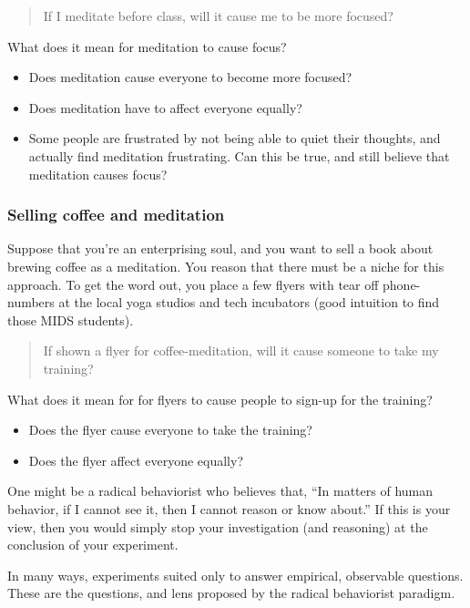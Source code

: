 \documentclass[
]{article}
\providecommand{\tightlist}{%
  \setlength{\itemsep}{0pt}\setlength{\parskip}{0pt}}
\theoremstyle{definition}
\theoremstyle{definition}
\theoremstyle{definition}
\theoremstyle{definition}
\theoremstyle{remark}
\begin{document}
\begin{quote}
If I meditate before class, will it cause me to be more focused?
\end{quote}

What does it mean for meditation to cause focus?

\begin{itemize}
\tightlist
\item
  Does meditation cause everyone to become more focused?
\item
  Does meditation have to affect everyone equally?
\item
  Some people are frustrated by not being able to quiet their thoughts, and actually find meditation frustrating. Can this be true, and still believe that meditation causes focus?
\end{itemize}

\subsubsection{Selling coffee and meditation}\label{selling-coffee-and-meditation}

Suppose that you're an enterprising soul, and you want to sell a book about brewing coffee as a meditation. You reason that there must be a niche for this approach. To get the word out, you place a few flyers with tear off phone-numbers at the local yoga studios and tech incubators (good intuition to find those MIDS students).

\begin{quote}
If shown a flyer for coffee-meditation, will it cause someone to take my training?
\end{quote}

What does it mean for for flyers to cause people to sign-up for the training?

\begin{itemize}
\tightlist
\item
  Does the flyer cause everyone to take the training?
\item
  Does the flyer affect everyone equally?
\end{itemize}

One might be a radical behaviorist who believes that, ``In matters of human behavior, if I cannot see it, then I cannot reason or know about.'' If this is your view, then you would simply stop your investigation (and reasoning) at the conclusion of your experiment.

In many ways, experiments suited only to answer empirical, observable questions. These are the questions, and lens proposed by the radical behaviorist paradigm.
\end{document}
